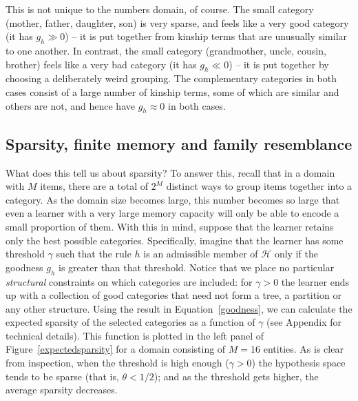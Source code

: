 \documentclass{apa}
\newcommand{\ruleset}{\mathcal{H}}
\begin{document}
This is not unique to the numbers domain, of course. The small category {\textsc (mother, father, daughter, son)} is very sparse, and feels like a very good category (it has $g_h \gg0$) -- it is put together from kinship terms that are unusually similar to one another. In contrast, the small category (grandmother, uncle, cousin, brother) feels like a very bad category (it has $g_h \ll 0$) -- it is put together by choosing a deliberately weird grouping. The complementary categories in both cases consist of a large number of kinship terms, some of which are similar and others are not, and hence have $g_h \approx 0$ in both cases.



\subsection{Sparsity, finite memory and family resemblance}

What does this tell us about sparsity? To answer this, recall that in a domain with $M$ items, there are a total of $2^M$ distinct ways to group items together into a category. As the domain size becomes large, this number becomes so large that even a learner with a very large memory capacity will only be able to encode a small proportion of them. With this in mind, suppose that the learner retains only the best possible categories. Specifically, imagine that the learner has some threshold $\gamma$ such that the rule $h$ is an admissible member of $\ruleset$ only if the goodness $g_h$ is greater than that threshold. Notice that we place no particular {\it structural} constraints on which categories are included: for $\gamma>0$ the learner ends up with a collection of good categories that need not form a tree, a partition or any other structure. Using the result in Equation~\ref{goodness}, we can calculate the expected sparsity of the selected categories as a function of $\gamma$ (see Appendix for technical details). This function is plotted in the left panel of Figure~\ref{expectedsparsity} for a domain consisting of $M=16$ entities. As is clear from inspection, when the threshold is high enough ($\gamma>0$) the hypothesis space tends to be sparse (that is, $\theta < 1/2$); and as the threshold gets higher, the average sparsity decreases.
\end{document}
